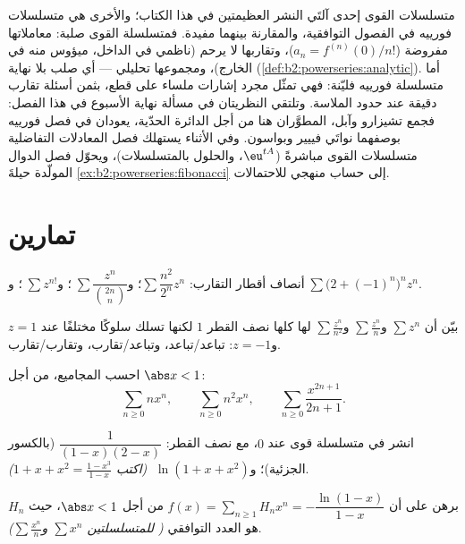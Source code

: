 \begin{remark}
متسلسلات القوى إحدى آلتَي النشر العظيمتين في هذا
الكتاب؛ والأخرى هي متسلسلات فورييه في الفصول
التوافقية، والمقارنة بينهما مفيدة. فمتسلسلة القوى
صلبة: معاملاتها مفروضة ($a_n = f^{(n)}(0)/n!$)،
وتقاربها لا يرحم (ناظمي في الداخل، ميؤوس منه في الخارج)،
ومجموعها تحليلي --- أي صلب بلا نهاية
(\cref{def:b2:powerseries:analytic}). أما متسلسلة فورييه فليّنة:
فهي تمثّل مجرد إشارات ملساء على قطع، بثمن
أسئلة تقارب دقيقة عند حدود الملاسة. وتلتقي النظريتان في
مسألة نهاية الأسبوع في هذا الفصل: فجمع تشيزارو وآبل، المطوَّران هنا من أجل
الدائرة الحدّية، يعودان في فصل فورييه بوصفهما نواتَي
فييير وبواسون. وفي الأثناء يستهلك فصل المعادلات
التفاضلية متسلسلات القوى مباشرةً ($\eu^{tA}$، والحلول
بالمتسلسلات)، ويحوّل فصل الدوال المولّدة
حيلةَ \cref{ex:b2:powerseries:fibonacci} إلى حساب منهجي
للاحتمالات.
\end{remark}

\section{تمارين}

\begin{exercise}[$\star$]\label{exo:b2:powerseries:1}
أنصاف أقطار التقارب:
$\sum \dfrac{n^2}{2^n}z^n$؛ و$\;\sum \dfrac{z^n}{\binom{2n}{n}}$؛
و$\;\sum z^{n!}$؛ و$\;\sum \bigl(2 + (-1)^n\bigr)^n z^n$.
\end{exercise}

\begin{exercise}[$\star$]\label{exo:b2:powerseries:2}
بيّن أن $\sum z^n$ و$\sum \frac{z^n}{n}$ و$\sum \frac{z^n}{n^2}$
لها كلها نصف القطر $1$ لكنها تسلك سلوكًا مختلفًا عند $z = 1$ و$z = -1$:
تباعد/تباعد، وتباعد/تقارب،
وتقارب/تقارب.
\end{exercise}

\begin{exercise}[$\star$]\label{exo:b2:powerseries:3}
احسب المجاميع، من أجل $\abs x < 1$:
\[
\sum_{n\geq0} n x^n,
\qquad
\sum_{n\geq0} n^2 x^n,
\qquad
\sum_{n\geq0} \frac{x^{2n+1}}{2n+1} .
\]
\end{exercise}

\begin{exercise}[$\star\star$]\label{exo:b2:powerseries:4}
انشر في متسلسلة قوى عند $0$، مع نصف القطر: $\dfrac{1}{(1-x)(2-x)}$
(بالكسور الجزئية)؛ و$\;\ln(1 + x + x^2)$ \emph{(اكتب $1 + x + x^2
= \frac{1 - x^3}{1 - x}$)}.
\end{exercise}

\begin{exercise}[$\star\star$]\label{exo:b2:powerseries:5}
برهن على أن $f(x) = \sum_{n\geq1} H_n x^n = -\dfrac{\ln(1 -
x)}{1 - x}$ من أجل $\abs x < 1$، حيث $H_n$ هو العدد التوافقي
\emph{( للمتسلسلتين $\sum x^n$ و$\sum \frac{x^n}{n}$)}.
\end{exercise}

